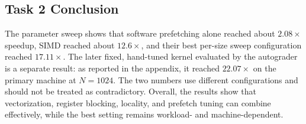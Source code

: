 \subsection{Task 2 Conclusion}
The parameter sweep shows that software prefetching alone reached about $2.08\times$ speedup, SIMD reached about $12.6\times$, and their best per-size sweep configuration reached $17.11\times$. The later fixed, hand-tuned kernel evaluated by the autograder is a separate result: as reported in the appendix, it reached $22.07\times$ on the primary machine at $N=1024$. The two numbers use different configurations and should not be treated as contradictory. Overall, the results show that vectorization, register blocking, locality, and prefetch tuning can combine effectively, while the best setting remains workload- and machine-dependent.
